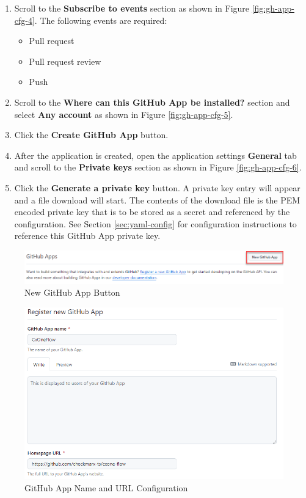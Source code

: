 \begin{enumerate}
    \item Scroll to the \textbf{Subscribe to events} section as shown in Figure \ref{fig:gh-app-cfg-4}.  The following events are required:
    \begin{itemize}
        \item Pull request
        \item Pull request review
        \item Push
    \end{itemize}
    \item Scroll to the \textbf{Where can this GitHub App be installed?} section and select \textbf{Any account} as shown in
    Figure \ref{fig:gh-app-cfg-5}.
    \item Click the \textbf{Create GitHub App} button.
    \item After the application is created, open the application settings \textbf{General} tab and scroll to the
    \textbf{Private keys} section as shown in Figure \ref{fig:gh-app-cfg-6}.
    \item Click the \textbf{Generate a private key} button.  A private key entry will appear and a file download will start.
    The contents of the download file is the PEM encoded private key that is to be stored as a secret and
    referenced by the \cxoneflow configuration.  See Section \ref{sec:yaml-config} for configuration instructions to
    reference this GitHub App private key.
\end{enumerate}

\begin{figure}[ht]
    \includegraphics[width=\textwidth]{graphics/gh-new-app.png}
    \caption{New GitHub App Button}
    \label{fig:gh-new-app}
\end{figure}


\begin{figure}[ht]
    \includegraphics[width=\textwidth]{graphics/gh-app-cfg-1.png}
    \caption{GitHub App Name and URL Configuration}
    \label{fig:gh-app-cfg-1}
\end{figure}

